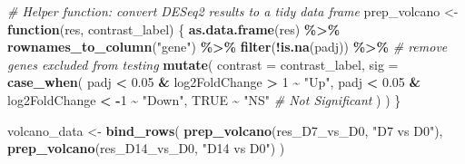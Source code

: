 \documentclass[
]{article}
\newenvironment{Shaded}{\begin{snugshade}}{\end{snugshade}}
\newcommand{\AttributeTok}[1]{\textcolor[rgb]{0.13,0.29,0.53}{#1}}
\newcommand{\CommentTok}[1]{\textcolor[rgb]{0.56,0.35,0.01}{\textit{#1}}}
\newcommand{\ConstantTok}[1]{\textcolor[rgb]{0.56,0.35,0.01}{#1}}
\newcommand{\ControlFlowTok}[1]{\textcolor[rgb]{0.13,0.29,0.53}{\textbf{#1}}}
\newcommand{\DecValTok}[1]{\textcolor[rgb]{0.00,0.00,0.81}{#1}}
\newcommand{\FloatTok}[1]{\textcolor[rgb]{0.00,0.00,0.81}{#1}}
\newcommand{\FunctionTok}[1]{\textcolor[rgb]{0.13,0.29,0.53}{\textbf{#1}}}
\newcommand{\NormalTok}[1]{#1}
\newcommand{\OtherTok}[1]{\textcolor[rgb]{0.56,0.35,0.01}{#1}}
\newcommand{\SpecialCharTok}[1]{\textcolor[rgb]{0.81,0.36,0.00}{\textbf{#1}}}
\newcommand{\StringTok}[1]{\textcolor[rgb]{0.31,0.60,0.02}{#1}}
\begin{document}
\begin{Shaded}
\begin{Highlighting}[]
\CommentTok{\# Helper function: convert DESeq2 results to a tidy data frame}
\NormalTok{prep\_volcano }\OtherTok{\textless{}{-}} \ControlFlowTok{function}\NormalTok{(res, contrast\_label) \{}
  \FunctionTok{as.data.frame}\NormalTok{(res) }\SpecialCharTok{\%\textgreater{}\%}
    \FunctionTok{rownames\_to\_column}\NormalTok{(}\StringTok{"gene"}\NormalTok{) }\SpecialCharTok{\%\textgreater{}\%}
    \FunctionTok{filter}\NormalTok{(}\SpecialCharTok{!}\FunctionTok{is.na}\NormalTok{(padj)) }\SpecialCharTok{\%\textgreater{}\%}      \CommentTok{\# remove genes excluded from testing}
    \FunctionTok{mutate}\NormalTok{(}
      \AttributeTok{contrast =}\NormalTok{ contrast\_label,}
      \AttributeTok{sig =} \FunctionTok{case\_when}\NormalTok{(}
\NormalTok{        padj }\SpecialCharTok{\textless{}} \FloatTok{0.05} \SpecialCharTok{\&}\NormalTok{ log2FoldChange }\SpecialCharTok{\textgreater{}}  \DecValTok{1} \SpecialCharTok{\textasciitilde{}} \StringTok{"Up"}\NormalTok{,}
\NormalTok{        padj }\SpecialCharTok{\textless{}} \FloatTok{0.05} \SpecialCharTok{\&}\NormalTok{ log2FoldChange }\SpecialCharTok{\textless{}} \SpecialCharTok{{-}}\DecValTok{1} \SpecialCharTok{\textasciitilde{}} \StringTok{"Down"}\NormalTok{,}
        \ConstantTok{TRUE} \SpecialCharTok{\textasciitilde{}} \StringTok{"NS"}   \CommentTok{\# Not Significant}
\NormalTok{      )}
\NormalTok{    )}
\NormalTok{\}}

\NormalTok{volcano\_data }\OtherTok{\textless{}{-}} \FunctionTok{bind\_rows}\NormalTok{(}
  \FunctionTok{prep\_volcano}\NormalTok{(res\_D7\_vs\_D0,  }\StringTok{"D7 vs D0"}\NormalTok{),}
  \FunctionTok{prep\_volcano}\NormalTok{(res\_D14\_vs\_D0, }\StringTok{"D14 vs D0"}\NormalTok{)}
\NormalTok{)}
\end{Highlighting}
\end{Shaded}
\end{document}
